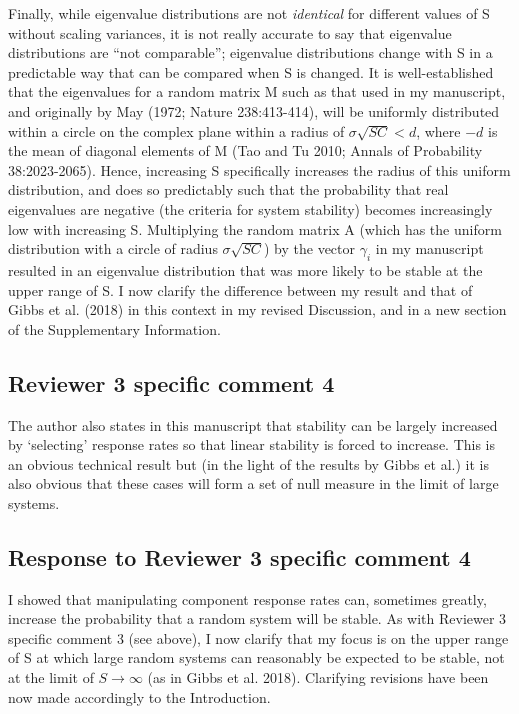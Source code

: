 \documentclass[]{article}
\begin{document}
Finally, while eigenvalue distributions are not \emph{identical} for
different values of S without scaling variances, it is not really
accurate to say that eigenvalue distributions are ``not comparable'';
eigenvalue distributions change with S in a predictable way that can be
compared when S is changed. It is well-established that the eigenvalues
for a random matrix M such as that used in my manuscript, and originally
by May (1972; Nature 238:413-414), will be uniformly distributed within
a circle on the complex plane within a radius of
\(\sigma\sqrt{SC} < d\), where \(-d\) is the mean of diagonal elements
of M (Tao and Tu 2010; Annals of Probability 38:2023-2065). Hence,
increasing S specifically increases the radius of this uniform
distribution, and does so predictably such that the probability that
real eigenvalues are negative (the criteria for system stability)
becomes increasingly low with increasing S. Multiplying the random
matrix A (which has the uniform distribution with a circle of radius
\(\sigma\sqrt{SC}\)) by the vector \(\gamma_{i}\) in my manuscript
resulted in an eigenvalue distribution that was more likely to be stable
at the upper range of S. I now clarify the difference between my result
and that of Gibbs et al. (2018) in this context in my revised
Discussion, and in a new section of the Supplementary Information.

\subsection{Reviewer 3 specific comment
4}\label{reviewer-3-specific-comment-4}

The author also states in this manuscript that stability can be largely
increased by `selecting' response rates so that linear stability is
forced to increase. This is an obvious technical result but (in the
light of the results by Gibbs et al.) it is also obvious that these
cases will form a set of null measure in the limit of large systems.

\subsection{Response to Reviewer 3 specific comment
4}\label{response-to-reviewer-3-specific-comment-4}

I showed that manipulating component response rates can, sometimes
greatly, increase the probability that a random system will be stable.
As with Reviewer 3 specific comment 3 (see above), I now clarify that my
focus is on the upper range of S at which large random systems can
reasonably be expected to be stable, not at the limit of
\(S \to \infty\) (as in Gibbs et al. 2018). Clarifying revisions have
been now made accordingly to the Introduction.
\end{document}
